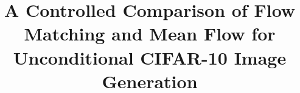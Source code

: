 \documentclass{iutbscthesis}
\title{A Controlled Comparison of Flow Matching and Mean Flow for Unconditional CIFAR-10 Image Generation}
\begin{document}
\titlepage










\printbib
\begin{appendices}



\end{appendices}
\end{document}
